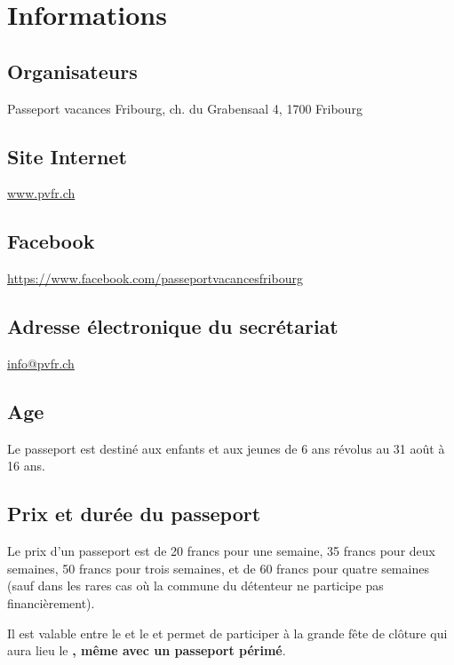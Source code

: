 \chapter{Informations}

\section*{Organisateurs}

Passeport vacances Fribourg, ch. du Grabensaal 4, 1700 Fribourg

\section*{Site Internet}

\url{www.pvfr.ch}

\section*{Facebook}

\url{https://www.facebook.com/passeportvacancesfribourg}

\section*{Adresse électronique du secrétariat}

\url{info@pvfr.ch}

\section*{Age}

Le passeport est destiné aux enfants et aux jeunes de 6 ans révolus au 31 août  à 16 ans.

\newpage
\section*{Prix et durée du passeport}

Le prix d'un passeport est de 20 francs pour une semaine, 35 francs pour deux semaines, 50 francs pour trois semaines,
et de 60 francs pour quatre semaines (sauf dans les rares cas où la commune du détenteur ne participe pas
financièrement).

Il est valable entre le  et le   et permet de participer à la grande fête de clôture qui aura lieu
le \textbf{ , même avec un passeport périmé}.

